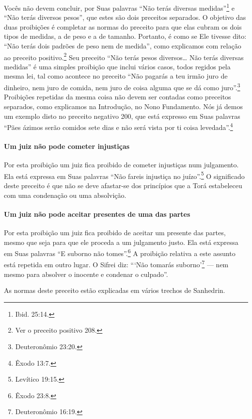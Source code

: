 Vocês não devem concluir, por Suas palavras ``Não terás diversas
medidas''\footnote{Ibid. 25:14.} e ``Não terás diversos pesos'', que estes são
dois preceitos separados. O objetivo das duas proibições é completar as
normas do preceito para que elas cubram os dois tipos de medidas, a de
peso e a de tamanho. Portanto, é como se Ele tivesse dito: ``Não terás
dois padrões de peso nem de medida'', como explicamos com relação ao
preceito positivo.\footnote{Ver o preceito positivo 208.} Seu preceito ``Não terás pesos
diversos\ldots{} Não terás diversas medidas'' é uma simples proibição que
inclui vários casos, todos regidos pela mesma lei, tal como acontece no
preceito ``Não pagarás a teu irmão juro de dinheiro, nem juro de comida,
nem juro de coisa alguma que se dá como juro''.\footnote{Deuteronômio 23:20.}
Proibições repetidas da mesma coisa não devem ser contadas como
preceitos separados, como explicamos na Introdução, no Nono Fundamento.
Nós já demos um exemplo disto no preceito negativo 200, que está
expresso em Suas palavras ``Pães ázimos serão comidos sete dias e não
será vista por ti coisa levedada''.\footnote{Êxodo 13:7.}

\paragraph{Um juiz não pode cometer injustiças}

Por esta proibição um juiz fica proibido de cometer injustiças num
julgamento. Ela está expressa em Suas palavras ``Não fareis injustiça no
juízo''.\footnote{Levítico 19:15.} O significado deste preceito é que não se deve
afastar-se dos princípios que a Torá estabeleceu com uma condenação ou
uma absolvição.

\paragraph{Um juiz não pode aceitar presentes de uma das partes}

Por esta proibição um juiz fica proibido de aceitar um presente das
partes, mesmo que seja para que ele proceda a um julgamento justo. Ela
está expressa em Suas palavras ``E suborno não tomes''.\footnote{Êxodo 23:8.} A
proibição relativa a este assunto está repetida em outro lugar. O Sifrei
diz: ```Não tomarás suborno'\footnote{Deuteronômio 16:19.} --- nem mesmo para
absolver o inocente e condenar o culpado''.

As normas deste preceito estão explicadas em vários trechos de Sanhedrin.

